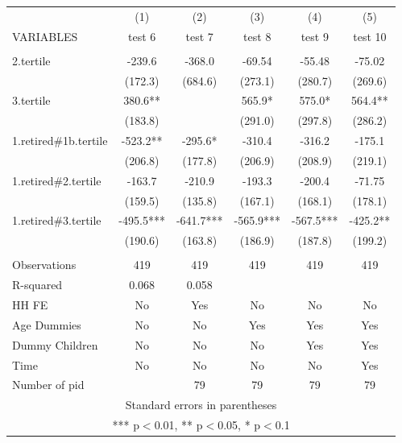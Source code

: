 \begin{tabular}{lccccc} \hline
 & (1) & (2) & (3) & (4) & (5) \\
VARIABLES & test 6 & test 7 & test 8 & test 9 & test 10 \\ \hline
 &  &  &  &  &  \\
2.tertile & -239.6 & -368.0 & -69.54 & -55.48 & -75.02 \\
 & (172.3) & (684.6) & (273.1) & (280.7) & (269.6) \\
3.tertile & 380.6** &  & 565.9* & 575.0* & 564.4** \\
 & (183.8) &  & (291.0) & (297.8) & (286.2) \\
1.retired\#1b.tertile & -523.2** & -295.6* & -310.4 & -316.2 & -175.1 \\
 & (206.8) & (177.8) & (206.9) & (208.9) & (219.1) \\
1.retired\#2.tertile & -163.7 & -210.9 & -193.3 & -200.4 & -71.75 \\
 & (159.5) & (135.8) & (167.1) & (168.1) & (178.1) \\
1.retired\#3.tertile & -495.5*** & -641.7*** & -565.9*** & -567.5*** & -425.2** \\
 & (190.6) & (163.8) & (186.9) & (187.8) & (199.2) \\
 &  &  &  &  &  \\
Observations & 419 & 419 & 419 & 419 & 419 \\
R-squared & 0.068 & 0.058 &  &  &  \\
HH FE & No & Yes & No & No & No \\
Age Dummies & No & No & Yes & Yes & Yes \\
Dummy Children & No & No & No & Yes & Yes \\
Time & No & No & No & No & Yes \\
 Number of pid &  & 79 & 79 & 79 & 79 \\ \hline
\multicolumn{6}{c}{ Standard errors in parentheses} \\
\multicolumn{6}{c}{ *** p$<$0.01, ** p$<$0.05, * p$<$0.1} \\
\end{tabular}
